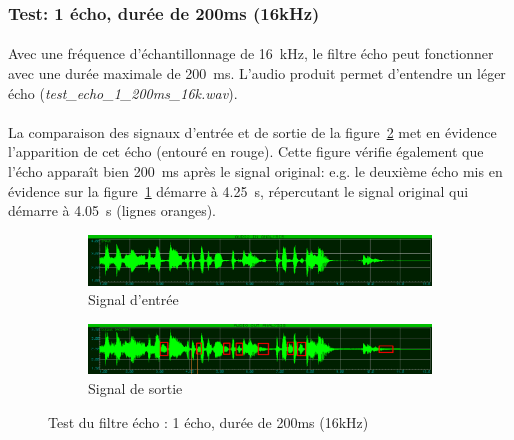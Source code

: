 \documentclass{article}
\begin{document}
    \subsubsection{Test: 1 écho, durée de 200ms (16kHz)}
    \paragraph{}
    Avec une fréquence d'échantillonnage de \SI{16}{\kilo\hertz}, le filtre écho peut fonctionner avec une durée maximale de \SI{200}{\milli\second}. L'audio produit permet d'entendre un léger écho (\emph{test\_echo\_1\_200ms\_16k.wav}).

    \paragraph{}
    La comparaison des signaux d'entrée et de sortie de la figure~\ref{fig:echo_16k} met en évidence l'apparition de cet écho (entouré en rouge). Cette figure vérifie également que l'écho apparaît bien \SI{200}{\milli\second} après le signal original: e.g. le deuxième écho mis en évidence sur la figure~\ref{fig:echo_16k_out} démarre à \SI{4.25}{\second}, répercutant le signal original qui démarre à \SI{4.05}{\second} (lignes oranges).

    \begin{figure}[H]
        \centering
        \begin{subfigure}[b]{\textwidth}
            \centering
            \includegraphics[width=\textwidth]{./images/in_echo_16k.png}
            \caption{Signal d'entrée}
        \end{subfigure}
        \begin{subfigure}[b]{\textwidth}
            \centering
            \includegraphics[width=\textwidth]{./images/out_echo_1_200ms_16k.png}
            \caption{Signal de sortie}
            \label{fig:echo_16k_out}
        \end{subfigure}
        \caption{Test du filtre écho : 1 écho, durée de 200ms (16kHz)}
        \label{fig:echo_16k}
    \end{figure}
\end{document}
